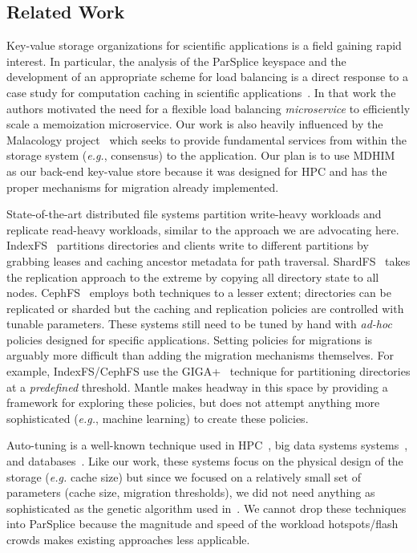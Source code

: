 \subsection{Related Work}

Key-value storage organizations for scientific applications is a field gaining
rapid interest. In particular, the analysis of the ParSplice keyspace and the
development of an appropriate scheme for load balancing is a direct response to
a case study for computation caching in scientific
applications~\cite{jenkins:ipdsw17-mochi}. In that work the authors motivated
the need for a flexible load balancing \emph{microservice} to efficiently scale
a memoization microservice. Our work is also heavily influenced by the
Malacology project~\cite{sevilla:eurosys17-malacology} which seeks to provide
fundamental services from within the storage system ({\it e.g.}, consensus) to
the application.  Our plan is to use
MDHIM~\cite{greenberg:hotstorage2015-mdhim} as our back-end key-value store
because it was designed for HPC and has the proper mechanisms for migration
already implemented.  

State-of-the-art distributed file systems partition write-heavy workloads and
replicate read-heavy workloads, similar to the approach we are advocating here.
IndexFS~\cite{ren:sc2014-indexfs} partitions directories and clients write to
different partitions by grabbing leases and caching ancestor metadata for path
traversal. ShardFS~\cite{xiao:socc15-shardfs} takes the replication approach to
the extreme by copying all directory state to all nodes.
CephFS~\cite{weil:sc2004-dyn-metadata, weil:osdi2006-ceph} employs both
techniques to a lesser extent; directories can be replicated or sharded but the
caching and replication policies are controlled with tunable parameters.  These
systems still need to be tuned by hand with {\it ad-hoc} policies designed for
specific applications.  Setting policies for migrations is arguably more
difficult than adding the migration mechanisms themselves.  For example,
IndexFS/CephFS use the GIGA+~\cite{patil:fast2011-giga} technique for
partitioning directories at a \emph{predefined} threshold. Mantle makes headway
in this space by providing a framework for exploring these policies, but does
not attempt anything more sophisticated ({\it e.g.}, machine learning) to
create these policies. 

Auto-tuning is a well-known technique used in
HPC~\cite{behzad:sc2013-autotuning, behzad:techreport2014-io-autotuning}, big
data systems systems~\cite{herodotou_starfish_2011}, and
databases~\cite{schnaitter_index_2009}.  Like our work, these systems focus on
the physical design of the storage ({\it e.g.} cache size) but since we focused
on a relatively small set of parameters (cache size, migration thresholds), we
did not need anything as sophisticated as the genetic algorithm used
in~\cite{behzad:sc2013-autotuning}.  We cannot drop these techniques into
ParSplice because the magnitude and speed of the workload hotspots/flash crowds
makes existing approaches less applicable. 

